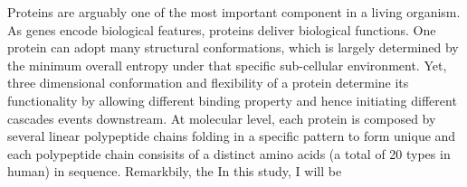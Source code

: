 Proteins are arguably one of the most important component in a living organism. As genes encode biological features, proteins deliver biological functions. One protein can adopt many structural conformations, which is largely determined by the minimum overall entropy under that specific sub-cellular environment. Yet, three dimensional conformation and flexibility of a protein determine its functionality by allowing different binding property and hence initiating different cascades events downstream. At molecular level, each protein is composed by several linear polypeptide chains folding in a specific pattern to form unique  and each polypeptide chain consisits of a distinct amino acids (a total of 20 types in human) in sequence. Remarkbily, the  In this study, I will be 